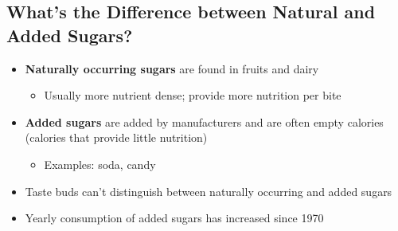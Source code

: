 \documentclass[12pt]{article}
\begin{document}
        \subsection{What's the Difference between Natural and Added Sugars?}
            \begin{itemize}
                \item \textbf{Naturally occurring sugars} are found in fruits and dairy
                    \begin{itemize}
                        \item Usually more nutrient dense; provide more nutrition per bite
                    \end{itemize}
                \item \textbf{Added sugars} are added by manufacturers and are often empty calories (calories that provide little nutrition)
                    \begin{itemize}
                        \item Examples: soda, candy
                    \end{itemize}
                \item Taste buds can't distinguish between naturally occurring and added sugars
                \item Yearly consumption of added sugars has increased since 1970
            \end{itemize}
\end{document}
